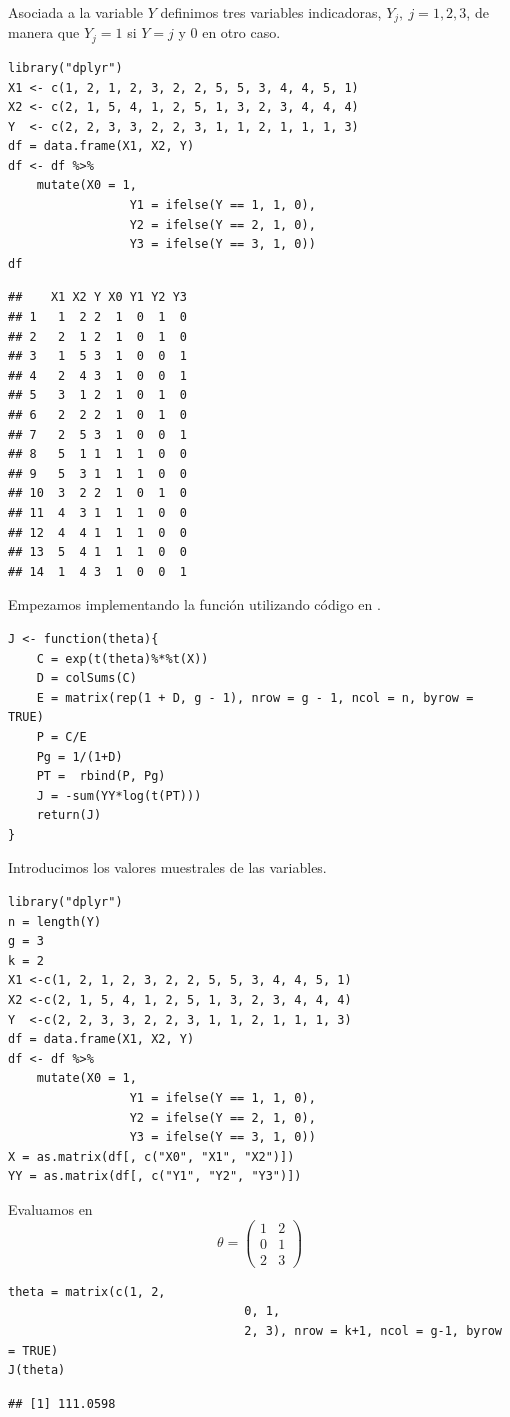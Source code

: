 Asociada a la variable $Y$ definimos tres variables indicadoras, $Y_j,\:j=1,2,3$, de manera que $Y_j=1$ si $Y=j$ y 0 en otro caso.
\begin{lstlisting}
library("dplyr")
X1 <- c(1, 2, 1, 2, 3, 2, 2, 5, 5, 3, 4, 4, 5, 1)
X2 <- c(2, 1, 5, 4, 1, 2, 5, 1, 3, 2, 3, 4, 4, 4)
Y  <- c(2, 2, 3, 3, 2, 2, 3, 1, 1, 2, 1, 1, 1, 3)
df = data.frame(X1, X2, Y)
df <- df %>%
	mutate(X0 = 1,
				 Y1 = ifelse(Y == 1, 1, 0),
				 Y2 = ifelse(Y == 2, 1, 0),
				 Y3 = ifelse(Y == 3, 1, 0))
df
\end{lstlisting}
\pagebreak
\begin{verbatim}
##    X1 X2 Y X0 Y1 Y2 Y3
## 1   1  2 2  1  0  1  0
## 2   2  1 2  1  0  1  0
## 3   1  5 3  1  0  0  1
## 4   2  4 3  1  0  0  1
## 5   3  1 2  1  0  1  0
## 6   2  2 2  1  0  1  0
## 7   2  5 3  1  0  0  1
## 8   5  1 1  1  1  0  0
## 9   5  3 1  1  1  0  0
## 10  3  2 2  1  0  1  0
## 11  4  3 1  1  1  0  0
## 12  4  4 1  1  1  0  0
## 13  5  4 1  1  1  0  0
## 14  1  4 3  1  0  0  1
\end{verbatim}
Empezamos implementando la función  utilizando código en .
\begin{lstlisting}
J <- function(theta){
	C = exp(t(theta)%*%t(X))
	D = colSums(C)
	E = matrix(rep(1 + D, g - 1), nrow = g - 1, ncol = n, byrow = TRUE)
	P = C/E
	Pg = 1/(1+D)
	PT =  rbind(P, Pg)
	J = -sum(YY*log(t(PT)))
	return(J)
}
\end{lstlisting}
Introducimos los valores muestrales de las variables.
\begin{lstlisting}
library("dplyr")
n = length(Y)
g = 3
k = 2
X1 <-c(1, 2, 1, 2, 3, 2, 2, 5, 5, 3, 4, 4, 5, 1)
X2 <-c(2, 1, 5, 4, 1, 2, 5, 1, 3, 2, 3, 4, 4, 4)
Y  <-c(2, 2, 3, 3, 2, 2, 3, 1, 1, 2, 1, 1, 1, 3)
df = data.frame(X1, X2, Y)
df <- df %>%
	mutate(X0 = 1,
				 Y1 = ifelse(Y == 1, 1, 0),
				 Y2 = ifelse(Y == 2, 1, 0),
				 Y3 = ifelse(Y == 3, 1, 0))
X = as.matrix(df[, c("X0", "X1", "X2")])
YY = as.matrix(df[, c("Y1", "Y2", "Y3")])
\end{lstlisting}

Evaluamos en \[ \theta=\begin{pmatrix}
	1 & 2\\
	0 & 1\\
	2 & 3
\end{pmatrix} \]
\begin{lstlisting}
theta = matrix(c(1, 2,
								 0, 1,
								 2, 3), nrow = k+1, ncol = g-1, byrow = TRUE)
J(theta)
\end{lstlisting}
\begin{verbatim}
## [1] 111.0598
\end{verbatim}

